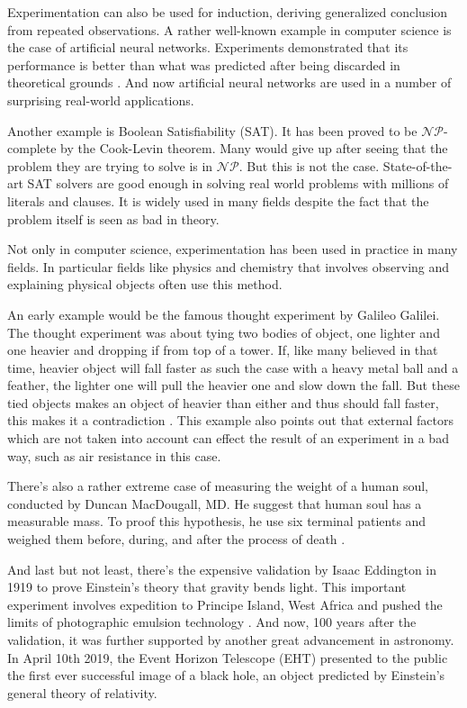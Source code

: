Experimentation can also be used for induction, deriving generalized conclusion from repeated observations.
A rather well-known example in computer science is the case of artificial neural networks.
Experiments demonstrated that its performance is better than what was predicted after being discarded in theoretical grounds \citep{tichyShouldComputerScientists1998}.
And now artificial neural networks are used in a number of surprising real-world applications.

Another example is Boolean Satisfiability (SAT).
It has been proved to be $\mathcal{NP}$-complete by the Cook-Levin theorem.
Many would give up after seeing that the problem they are trying to solve is in $\mathcal{NP}$.
But this is not the case.
State-of-the-art SAT solvers are good enough in solving real world problems with millions of literals and clauses.
It is widely used in many fields despite the fact that the problem itself is seen as bad in theory.

Not only in computer science, experimentation has been used in practice in many fields.
In particular fields like physics and chemistry that involves observing and explaining physical objects often use this method.

An early example would be the famous thought experiment by Galileo Galilei.
The thought experiment was about tying two bodies of object, one lighter and one heavier and dropping if from top of a tower.
If, like many believed in that time, heavier object will fall faster as such the case with a heavy metal ball and a feather, the lighter one will pull the heavier one and slow down the fall.
But these tied objects makes an object of heavier than either and thus should fall faster, this makes it a contradiction \citep{goodmanWhatDoesResearch2016}. This example also points out that external factors which are not taken into account can effect the result of an experiment in a bad way, such as air resistance in this case.

There's also a rather extreme case of measuring the weight of a human soul, conducted by Duncan MacDougall, MD. He suggest that human soul has a measurable mass. To proof this hypothesis, he use six terminal patients and weighed them before, during, and after the process of death \citep{ryanModernExperimentalDesign2007a}.

And last but not least, there's the expensive validation by Isaac Eddington in 1919 to prove Einstein's theory that gravity bends light.
This important experiment involves expedition to Principe Island, West Africa and pushed the limits of photographic emulsion technology \citep{tichyShouldComputerScientists1998}.
And now, 100 years after the validation, it was further supported by another great advancement in astronomy.
In April 10th 2019, the Event Horizon Telescope (EHT) presented to the public the first ever successful image of a black hole, an object predicted by Einstein's general theory of relativity.

